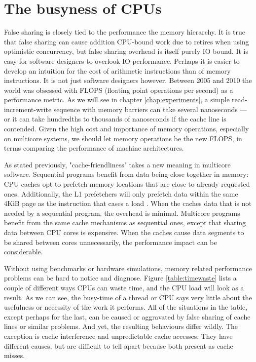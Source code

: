 \chapter{The busyness of CPUs}
\label{chap:busyness}

False sharing is closely tied to the performance the memory hierarchy.
It is true that false sharing can cause addition CPU-bound work due to retires
when using optimistic concurrency, but false sharing overhead is itself purely
IO bound. It is easy for software designers to overlook IO performance. Perhaps
it is easier to develop an intuition for the cost of arithmetic instructions
than of memory instructions. It is not just software designers however. Between
2005 and 2010 the world was obsessed with FLOPS (floating point operations per
second) as a performance metric. As we will see in chapter
\ref{chap:experiments}, a simple read-increment-write sequence with memory
barriers can take several nanoseconds --- or it can take hundredths to thousands
of nanoseconds if the cache line is contended. Given the high cost and
importance of memory operations, especially on multicore systems, we should
let memory operations be the new FLOPS, in terms comparing the
performance of machine architectures.

As stated previously, "cache-friendliness" takes a new meaning in multicore
software. Sequential programs benefit from data being close together in memory:
CPU caches opt to prefetch memory locations that are close to already requested
ones. Additionally, the L1 prefetchers will only prefetch data within the same
4KiB page as the instruction that cases a load \cite{inteloptimize}. When the
caches data that is not needed by a sequential program, the overhead is
minimal. Multicore programs benefit from the same cache mechanisms as sequential
ones, except that sharing data between CPU cores is expensive. When the caches
cause data segments to be shared between cores unnecessarily, the performance
impact can be considerable.

Without using benchmarks or hardware simulations, memory related performance
problems can be hard to notice and diagnose. Figure \ref{table:timewaste} lists
a couple of different ways CPUs can waste time, and the CPU load will look as a
result. As we can see, the busy-time of a thread or CPU says very little about
the usefulness or necessity of the work it performs. All of the situations in
the table, except perhaps for the last, can be caused or aggravated by false
sharing of cache lines or similar problems. And yet, the resulting behaviours
differ wildly. The exception is cache interference and unpredictable cache
accesses. They have different causes, but are difficult to tell apart because
both present as cache misses.

